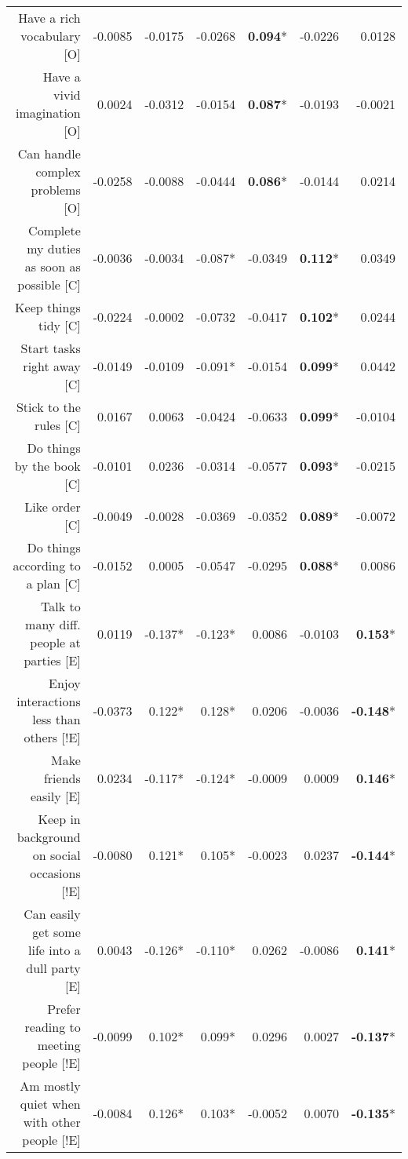 {\begin{tabular}{rrrrrrr}
Have a rich vocabulary [O]                                &-0.0085 &-0.0175 &-0.0268 & \textbf{0.094}* &-0.0226 & 0.0128\\
Have a vivid imagination [O]                              & 0.0024 &-0.0312 &-0.0154 & \textbf{0.087}* &-0.0193 &-0.0021\\
Can handle complex problems [O]                           &-0.0258 &-0.0088 &-0.0444 & \textbf{0.086}* &-0.0144 & 0.0214\\
Complete my duties as soon as possible [C]                &-0.0036 &-0.0034 &-0.087* &-0.0349 & \textbf{0.112}* & 0.0349\\
Keep things tidy [C]                                      &-0.0224 &-0.0002 &-0.0732 &-0.0417 & \textbf{0.102}* & 0.0244\\
Start tasks right away [C]                                &-0.0149 &-0.0109 &-0.091* &-0.0154 & \textbf{0.099}* & 0.0442\\
Stick to the rules [C]                                    & 0.0167 & 0.0063 &-0.0424 &-0.0633 & \textbf{0.099}* &-0.0104\\
Do things by the book [C]                                 &-0.0101 & 0.0236 &-0.0314 &-0.0577 & \textbf{0.093}* &-0.0215\\
Like order [C]                                            &-0.0049 &-0.0028 &-0.0369 &-0.0352 & \textbf{0.089}* &-0.0072\\
Do things according to a plan [C]                         &-0.0152 & 0.0005 &-0.0547 &-0.0295 & \textbf{0.088}* & 0.0086\\
Talk to many diff. people at parties [E]          		  & 0.0119 &-0.137* &-0.123* & 0.0086 &-0.0103 & \textbf{0.153}*\\
Enjoy interactions less than others [!E]                  &-0.0373 & 0.122* & 0.128* & 0.0206 &-0.0036 &\textbf{-0.148}*\\
Make friends easily [E]                                   & 0.0234 &-0.117* &-0.124* &-0.0009 & 0.0009 & \textbf{0.146}*\\
Keep in background on social occasions [!E]   		  &-0.0080 & 0.121* & 0.105* &-0.0023 & 0.0237 &\textbf{-0.144}*\\
Can easily get some life into a dull party [E]            & 0.0043 &-0.126* &-0.110* & 0.0262 &-0.0086 & \textbf{0.141}*\\
Prefer reading to meeting people [!E]                     &-0.0099 & 0.102* & 0.099* & 0.0296 & 0.0027 &\textbf{-0.137}*\\
Am mostly quiet when with other people [!E]               &-0.0084 & 0.126* & 0.103* &-0.0052 & 0.0070 &\textbf{-0.135}*\\

\end{tabular}}
